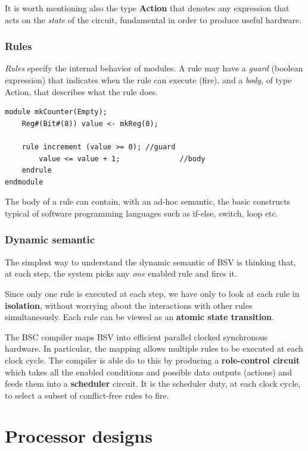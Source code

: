 \documentclass[12pt,oneside,a4paper]{article}
\begin{document}
It is worth mentioning also the type \textbf{Action} that denotes any expression that acts on the \textit{state} of the circuit, fundamental in order to produce useful hardware.
\subsubsection{Rules}
\textit{Rules} specify the internal behavior of modules. A rule may have a \textit{guard} (boolean expression) that indicates when the rule can execute (fire), and a \textit{body}, of type Action, that describes what the rule does.
\begin{lstlisting}[label={bsv:paramtype},caption={Autoincrementing couter with a single rule}]
module mkCounter(Empty);
	Reg#(Bit#(8)) value <- mkReg(0);
	
	rule increment (value >= 0); //guard
		value <= value + 1;			 	 //body
	endrule
endmodule
\end{lstlisting}

The body of a rule can contain, with an ad-hoc semantic, the basic constructs typical of software programming languages such as if-else, switch, loop etc.

\subsubsection{Dynamic semantic}

The simplest way to understand the dynamic semantic of BSV is thinking that, at each step, the system picks any \textit{one} enabled rule and fires it.

Since only one rule is executed at each step, we have only to look at each rule in \textbf{isolation}, without worrying about the interactions with other rules simultaneously. Each rule can be viewed as an \textbf{atomic state transition}.

The BSC compiler maps BSV into efficient parallel clocked synchronous hardware. In particular, the mapping allows multiple rules to be executed at each clock cycle. The compiler is able do to this by producing a \textbf{role-control circuit} which takes all the enabled conditions and possible data outputs (actions) and feeds them into a \textbf{scheduler} circuit. It is the scheduler duty, at each clock cycle, to select a subset of conflict-free rules to fire.

\section{Processor designs}
\end{document}
